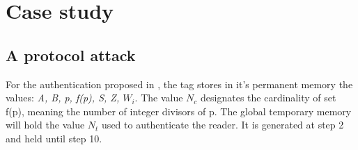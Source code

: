 \chapter{Case study}

\section{A protocol attack}

    For the authentication proposed in \cite{BOM}, the tag stores in it's permanent memory the values: \textit{A, B, p, f(p), S, Z, $W_i$}.
    The value $N_c$ designates the cardinality of set f(p), meaning the number of integer divisors of p.
    The global temporary memory will hold the value $N_t$
    used to authenticate the reader. It is generated at step 2 and held until step 10.


